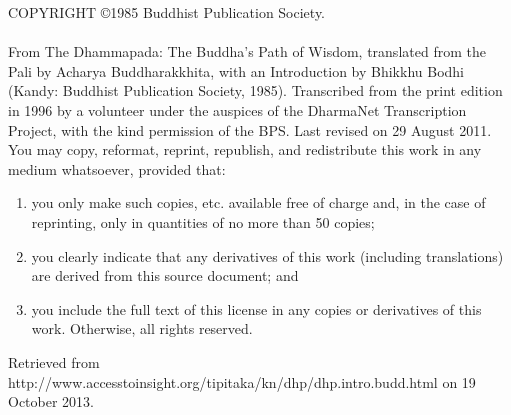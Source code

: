 \thispagestyle{empty}
COPYRIGHT \copyright 1985 Buddhist Publication Society.
~\\
~\\
From The Dhammapada: The Buddha's Path of Wisdom, translated from the Pali by Acharya Buddharakkhita, with an Introduction by Bhikkhu Bodhi (Kandy: Buddhist Publication Society, 1985). Transcribed from the print edition in 1996 by a volunteer under the auspices of the DharmaNet Transcription Project, with the kind permission of the BPS. Last revised on 29 August 2011. You may copy, reformat, reprint, republish, and redistribute this work in any medium whatsoever, provided that:
\begin{enumerate}
\item you only make such copies, etc. available free of charge and, in the case of reprinting, only in quantities of no more than 50 copies;
\item you clearly indicate that any derivatives of this work (including translations) are derived from this source document; and
\item you include the full text of this license in any copies or derivatives of this work. Otherwise, all rights reserved.
\end{enumerate}

Retrieved from http://www.accesstoinsight.org/tipitaka/kn/dhp/dhp.intro.budd.html on 19 October 2013.